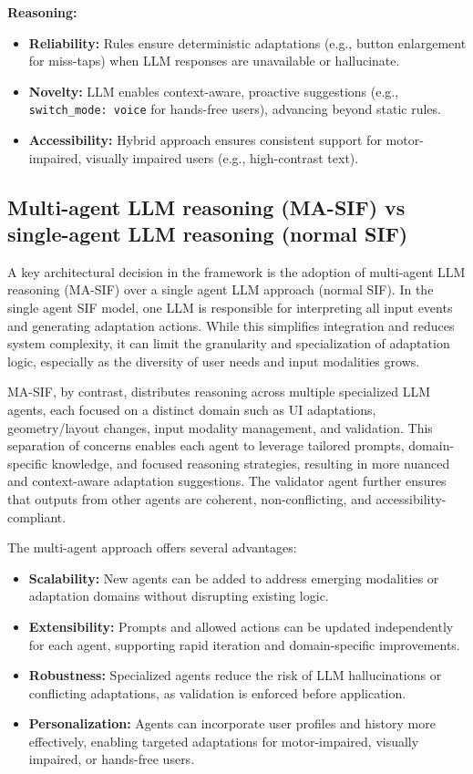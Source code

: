 \textbf{Reasoning:}
\begin{itemize}
  \item \textbf{Reliability:} Rules ensure deterministic adaptations (e.g., button enlargement for miss-taps) when LLM responses are unavailable or hallucinate.
  \item \textbf{Novelty:} LLM enables context-aware, proactive suggestions (e.g., \verb|switch_mode: voice| for hands-free users), advancing beyond static rules.
  \item \textbf{Accessibility:} Hybrid approach ensures consistent support for motor-impaired, visually impaired users (e.g., high-contrast text).
\end{itemize}

\subsection{Multi-agent LLM reasoning (MA-SIF) vs single-agent LLM reasoning (normal SIF)}
A key architectural decision in the framework is the adoption of multi-agent LLM reasoning (MA-SIF) over a single agent LLM approach (normal SIF). In the single agent SIF model, one LLM is responsible for interpreting all input events and generating adaptation actions. While this simplifies integration and reduces system complexity, it can limit the granularity and specialization of adaptation logic, especially as the diversity of user needs and input modalities grows.

MA-SIF, by contrast, distributes reasoning across multiple specialized LLM agents, each focused on a distinct domain such as UI adaptations, geometry/layout changes, input modality management, and validation. This separation of concerns enables each agent to leverage tailored prompts, domain-specific knowledge, and focused reasoning strategies, resulting in more nuanced and context-aware adaptation suggestions. The validator agent further ensures that outputs from other agents are coherent, non-conflicting, and accessibility-compliant.

The multi-agent approach offers several advantages: \begin{itemize} \item \textbf{Scalability:} New agents can be added to address emerging modalities or adaptation domains without disrupting existing logic. \item \textbf{Extensibility:} Prompts and allowed actions can be updated independently for each agent, supporting rapid iteration and domain-specific improvements. \item \textbf{Robustness:} Specialized agents reduce the risk of LLM hallucinations or conflicting adaptations, as validation is enforced before application. \item \textbf{Personalization:} Agents can incorporate user profiles and history more effectively, enabling targeted adaptations for motor-impaired, visually impaired, or hands-free users. \end{itemize}

